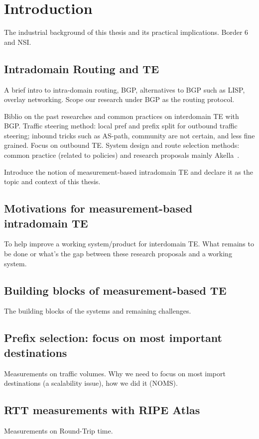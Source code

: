 \chapter{Introduction}
The industrial background of this thesis and its practical implications.
Border 6 and NSI.

\section{Intradomain Routing and TE}
A brief intro to intra-domain routing, BGP, alternatives to BGP such as LISP, overlay networking.
Scope our research under BGP as the routing protocol.

Biblio on the past researches and common practices on interdomain TE with BGP.
Traffic steering method: local pref and prefix split for outbound traffic steering; inbound tricks such as AS-path, community are not certain, and less fine grained. Focus on outbound TE.
System design and route selection methods: common practice (related to policies) and research proposals mainly Akella~\cite{Akella2008}.

Introduce the notion of measurement-based intradomain TE and declare it as the topic and context of this thesis.

\section{Motivations for measurement-based intradomain TE}
To help improve a working system/product for interdomain TE.
What remains to be done or what's the gap between these research proposals and a working system.

\section{Building blocks of measurement-based TE}
The building blocks of the systems and remaining challenges.

\section{Prefix selection: focus on most important destinations}
Measurements on traffic volumes.
Why we need to focus on most import destinations (a scalability issue), how we did it (NOMS).

\section{RTT measurements with RIPE Atlas}
Measurements on Round-Trip time.
